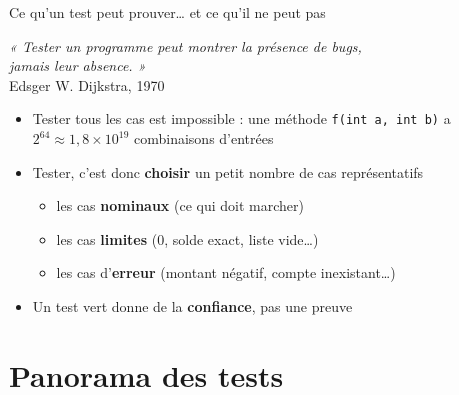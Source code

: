 \documentclass[aspectratio=169,10pt]{beamer}
\begin{document}
\begin{frame}{Ce qu'un test peut prouver\ldots{} et ce qu'il ne peut pas}
  \begin{center}
    \begin{datacard}
      \textit{« Tester un programme peut montrer la présence de bugs,\\ jamais leur absence. »}\\[1mm]
      {\scriptsize\color{qamuted} Edsger W. Dijkstra, 1970}
    \end{datacard}
  \end{center}
  \begin{itemize}
    \item Tester tous les cas est impossible : une méthode \texttt{f(int a, int b)} a $2^{64} \approx 1{,}8 \times 10^{19}$ combinaisons d'entrées
    \item Tester, c'est donc \textbf{choisir} un petit nombre de cas représentatifs
      \begin{itemize}
        \item les cas \textbf{nominaux} (ce qui doit marcher)
        \item les cas \textbf{limites} (0, solde exact, liste vide\ldots)
        \item les cas d'\textbf{erreur} (montant négatif, compte inexistant\ldots)
      \end{itemize}
    \item Un test vert donne de la \textbf{confiance}, pas une preuve
  \end{itemize}
\end{frame}

\section{Panorama des tests}
\end{document}
